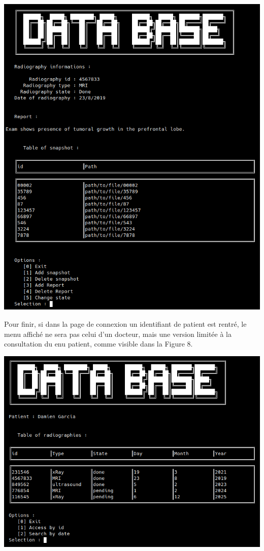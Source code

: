\documentclass[12pt,a4paper]{article}
\newenvironment{Figure}
{\par\medskip\noindent\minipage{\linewidth}}
{\endminipage\par\medskip}
\begin{document}
\begin{multicols}{2}
		\begin{Figure}
			\centering
			\includegraphics[width=\linewidth]{images/walkthrough/doctor_patient_searchid.png}
			\label{fig:search_id}
		\end{Figure}
		
		Pour finir, si dans la page de connexion un identifiant de patient est rentré, le menu affiché ne sera pas celui d'un docteur, mais une version limitée à la consultation du enu patient, comme visible dans la Figure 8. \\
		
		\begin{Figure}
			\centering
			\includegraphics[width=\linewidth]{images/walkthrough/patient_main.png}
			\label{fig:radio_menu}
		\end{Figure}
		

\end{multicols}
\end{document}

